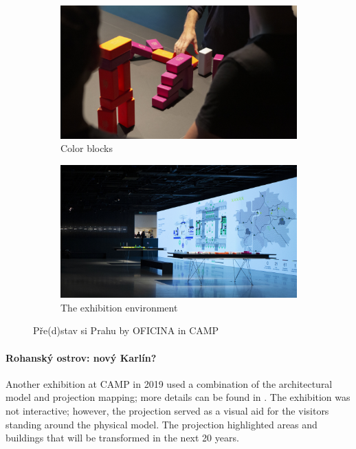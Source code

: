 \begin{figure}[h]
    \centering
    \begin{subfigure}[t]{0.49\linewidth}
        \centering
        \includegraphics[width=\linewidth]{figures/oficina1.jpg}
        \caption{Color blocks \cite{oficinaPredstav}}
        \label{fig:oficinablocks}
    \end{subfigure}
    \begin{subfigure}[t]{0.49\linewidth}
        \centering
        \includegraphics[width=\linewidth]{figures/oficina2.jpg}
        \caption{The exhibition environment \cite{oficinaPredstav}}
        \label{fig:oficinaexhib}
    \end{subfigure}
    \caption{Pře(d)stav si Prahu by OFICINA in CAMP}
    \label{fig:oficinapredstav}
\end{figure}


\paragraph{Rohanský ostrov: nový Karlín?} 
Another exhibition at CAMP in 2019 used a combination of the architectural model and projection mapping; more details can be found in \cite{iprRohan}. The exhibition was not interactive; however, the projection served as a visual aid for the visitors standing around the physical model. The projection highlighted areas and buildings that will be transformed in the next 20 years.

